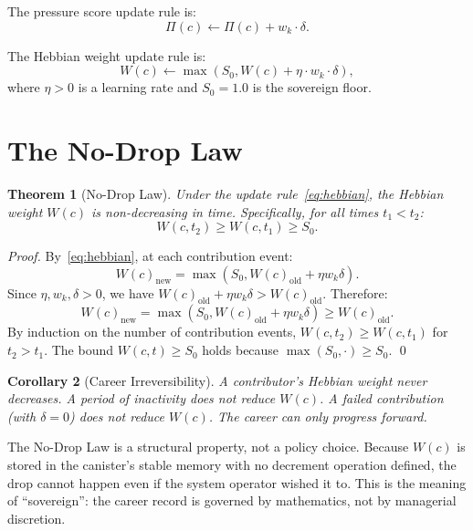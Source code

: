 \documentclass[12pt]{article}
\newtheorem{theorem}{Theorem}
\newtheorem{corollary}[theorem]{Corollary}
\begin{document}
The pressure score update rule is:
\begin{equation}
  \Pi(c) \gets \Pi(c) + w_k \cdot \delta.
  \label{eq:pressure}
\end{equation}

The Hebbian weight update rule is:
\begin{equation}
  W(c) \gets \max(S_0, W(c) + \eta \cdot w_k \cdot \delta),
  \label{eq:hebbian}
\end{equation}
where $\eta > 0$ is a learning rate and $S_0 = 1.0$ is the sovereign floor.

\section{The No-Drop Law}
\label{sec:nodrop}

\begin{theorem}[No-Drop Law]
  Under the update rule~\eqref{eq:hebbian}, the Hebbian weight $W(c)$ is
  non-decreasing in time.  Specifically, for all times $t_1 < t_2$:
  \[
    W(c, t_2) \ge W(c, t_1) \ge S_0.
  \]
\end{theorem}

\begin{proof}
  By~\eqref{eq:hebbian}, at each contribution event:
  \[
    W(c)_\text{new} = \max(S_0, W(c)_\text{old} + \eta w_k \delta).
  \]
  Since $\eta, w_k, \delta > 0$, we have $W(c)_\text{old} + \eta w_k \delta >
  W(c)_\text{old}$.  Therefore:
  \[
    W(c)_\text{new} = \max(S_0, W(c)_\text{old} + \eta w_k \delta)
    \ge W(c)_\text{old}.
  \]
  By induction on the number of contribution events, $W(c, t_2) \ge W(c, t_1)$
  for $t_2 > t_1$.  The bound $W(c, t) \ge S_0$ holds because $\max(S_0, \cdot)
  \ge S_0$. \qed
\end{proof}

\begin{corollary}[Career Irreversibility]
  A contributor's Hebbian weight never decreases.  A period of inactivity does
  not reduce $W(c)$.  A failed contribution (with $\delta = 0$) does not
  reduce $W(c)$.  The career can only progress forward.
\end{corollary}

\begin{remark}
  The No-Drop Law is a structural property, not a policy choice.  Because $W(c)$
  is stored in the canister's stable memory with no decrement operation defined,
  the drop cannot happen even if the system operator wished it to.  This is the
  meaning of ``sovereign'': the career record is governed by mathematics, not
  by managerial discretion.
\end{remark}
\end{document}
